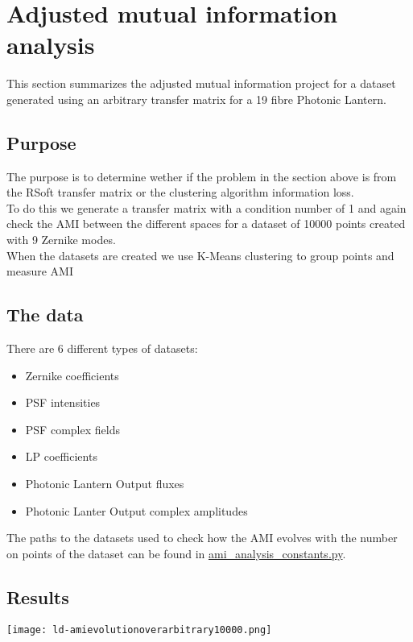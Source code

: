\section{Adjusted mutual information analysis}
	This section summarizes the adjusted mutual information project for a dataset generated using an arbitrary transfer matrix for a 19 fibre Photonic Lantern.
	
	
	\subsection{Purpose}
	
		The purpose is to determine wether if the problem in the section above is from the RSoft transfer matrix or the clustering algorithm information loss.\\
		
		To do this we generate a transfer matrix with a condition number of 1 and again check the AMI between the different spaces for a dataset of 10000 points created with 9 Zernike modes.\\
		
		When the datasets are created we use K-Means clustering to group points and measure AMI\\
		
		
	\subsection{The data}
		There are 6 different types of datasets:
		\begin{itemize}
			\item Zernike coefficients
			\item PSF intensities
			\item PSF complex fields
			\item LP coefficients
			\item Photonic Lantern Output fluxes
			\item Photonic Lanter Output complex amplitudes
		\end{itemize}
		
		The paths to the datasets used to check how the AMI evolves with the number on points of the dataset can be found in \href{https://github.com/Dacarpe03/PLImageReconstruction/blob/main/Utils/ami_analysis_constants.py}{ami\_analysis\_constants.py}.
		
	
	\subsection{Results}
		\begin{figure*}[ht!]
			\centering
			\texttt{[image: ld-amievolutionoverarbitrary10000.png]}
		\end{figure*}
		\FloatBarrier
		
